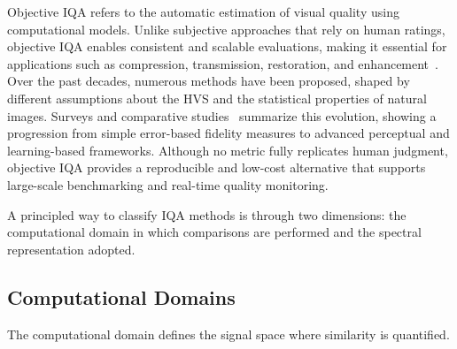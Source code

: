Objective \acs{IQA} refers to the automatic estimation of visual quality using computational models. Unlike subjective approaches that rely on human ratings, objective \acs{IQA} enables consistent and scalable evaluations, making it essential for applications such as compression, transmission, restoration, and enhancement~\cite{gonzalez2009digital, moorthy2011blind, lin2020surpassing}. Over the past decades, numerous methods have been proposed, shaped by different assumptions about the \acf{HVS} and the statistical properties of natural images. Surveys and comparative studies~\cite{survey2019shahrukh, wang2004image, liu2012fusion, ding2020dists} summarize this evolution, showing a progression from simple error-based fidelity measures to advanced perceptual and learning-based frameworks. Although no metric fully replicates human judgment, objective \acs{IQA} provides a reproducible and low-cost alternative that supports large-scale benchmarking and real-time quality monitoring.

A principled way to classify \acs{IQA} methods is through two dimensions: the computational domain in which comparisons are performed and the spectral representation adopted.

\subsection{Computational Domains}

The computational domain defines the signal space where similarity is quantified.

